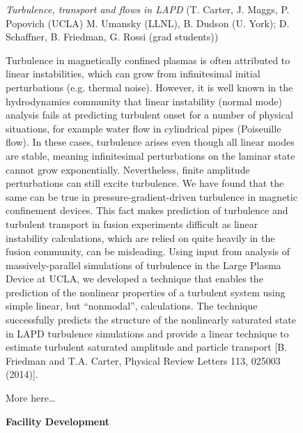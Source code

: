 \documentclass[11pt]{article}
\begin{document}
\begin{description}
\begin{figure}[!htbp]
\emph{Turbulence, transport and flows in LAPD} (T. Carter, J. Maggs, P.
Popovich (UCLA) M. Umansky (LLNL), B. Dudson (U. York); D. Schaffner, B.
Friedman, G. Rossi (grad students))

Turbulence in magnetically confined plasmas is often attributed to
linear instabilities, which can grow from infinitesimal initial
perturbations (e.g. thermal noise). However, it is well known in the
hydrodynamics community that linear instability (normal mode) analysis
fails at predicting turbulent onset for a number of physical situations,
for example water flow in cylindrical pipes (Poiseuille flow). In these
cases, turbulence arises even though all linear modes are stable,
meaning infinitesimal perturbations on the laminar state cannot grow
exponentially. Nevertheless, finite amplitude perturbations can still
excite turbulence. We have found that the same can be true in
pressure-gradient-driven turbulence in magnetic confinement devices.
This fact makes prediction of turbulence and turbulent transport in
fusion experiments difficult as linear instability calculations, which
are relied on quite heavily in the fusion community, can be misleading.
Using input from analysis of massively-parallel simulations of
turbulence in the Large Plasma Device at UCLA, we developed a technique
that enables the prediction of the nonlinear properties of a turbulent
system using simple linear, but ``nonmodal'', calculations. The
technique successfully predicts the structure of the nonlinearly
saturated state in LAPD turbulence simulations and provide a linear
technique to estimate turbulent saturated amplitude and particle
transport {[}B. Friedman and T.A. Carter, Physical Review Letters 113,
025003 (2014){]}.

More here\ldots{}


\textbf{Facility Development}


\end{figure}
\end{description}
\end{document}
